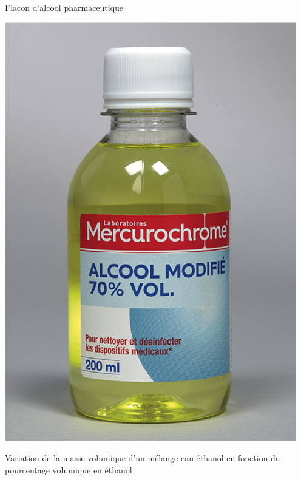 \begin{multicols}{2}
    \begin{doc}{Flacon d'alcool pharmaceutique}
\begin{center}
    \includegraphics[scale=0.81]{Images/TP3/Alcool_pharma.png}
\end{center}
\end{doc}
\begin{doc}{Variation de la masse volumique d’un mélange eau-éthanol en fonction du pourcentage volumique en éthanol}
\vspace{-1cm}
\begin{center}

\end{center}
\end{doc}
\end{multicols}

